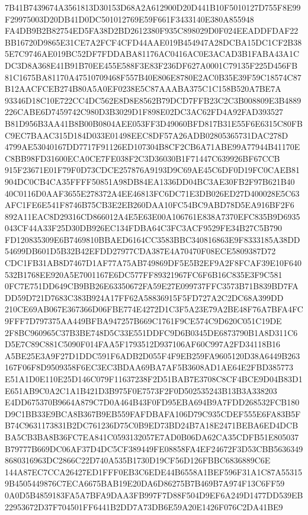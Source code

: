 \documentclass[UTF8,fontset=fandol,zihao=-4,a4paper]{ctexart}
\begin{document}
{{7B41B7439674A3561813D30153D68A2A612900D20D441B10F5010127D755F8E99F29975003D20DB41D0DC501012769E59F661F3433140E380A855948
FA4DB9B2B82754ED5FA38D2BD2612380F935C898029D0F024EEADDFDAF22BB16720D9865E31CE7A2FCF4CFD44AAE019B454947A28DCBA15DC1CF2B38
5E7C9746AE019BC52DF7FDDABA81176AC0416AC0E3ACAD3B1FABA43A1CDC3D8A368E41B91B70EE455E588F3E83F236DF627A0001C79135F225D456FB
81C1675BA81170A47510709468F557B40E806E8780E2AC0B35E39F59C18574C87B12AACFCEB274B80A5A0EF0238E5C87AAABA375C1C158B520A7BE7A
93346D18C10E722CC4DC562E8D8E8562B79DCD7FFB23C2C3B008809E3B4889226CABE6D7459742C980D3B3029D1F898E02DC3AC62FD4A92FAD393527
B81D956B3AA41B8B00B0804AEE053FF3D49060BFD817B31E55F6E6315C80FBC9EC7BAAC315D184D033E01498EEC8DF57A26ADB02805365731DAC278D
4799AE53040167DD7717F91126ED107304B8CF2CB6A71ABE99A77944B41170EC8BB98FD31600ECA0CE7FE038F2C3D36030B1F71447C639926BF67CCB
915F23671E01F79F0D73CDCE257876A9193D9C69AE45C6DF0D19FC0CAEB81904DC0CB4CA35FFFF50851A98DB84EA1336DD04BC3AE30FB2F97B621B40
40C0116D0AAF3655E278372A4EE46813FC6DC71E3DB026ED27D400028E5C63AFC1FE6E541F8746B75CB3E2EB260DAA10FC54BC9ABD78D5EA916BF2F6
892A11EAC8D29316CD866012A4E5E63E00A106761E838A7370EFC835B9D6935043CF44A33F25D30DB926EC134FDBA64C3FC3ACF9529FE34B27C5B790
FD120835309E6B7469810BBAED6164CC3583BBC340816863E9F8333185A38DD54699DB601D5B32B42EFDD27977CDA387E4A70470F08ECE5809387D72
CDC1FB31AB8D7467D1AF77A75AB749869DF5E5B2EF9A2F8FCAF39E10F640532B1768EE920A5E7001167E6DC577FF89321967FC6F6B16C835E3F9C581
0FC7E751DD649CB9BB26E63350672FA59E27E099737FFC3573B71B839BD7FADD59D721D7683C383B924A17FF62A58836915F5FD727A2C2DC68A399DD
210CE69AB067E367366D06FBE774E4272D1C3F5A23E79A2BE48F76A7BFA4FC9FFF7D797375AA449BFBA947257B669C1761F9CE574C9D620C051C19DE
2F8BC960965C37B3BE748D5C33E551DDFC9D6B0345DE6873790B1A8D311C6D5E7C89C881C5090F014FAA5F1793512D937106AF60C997A2FD34118B16
A5BE25E3A9F27D1DDC591F6ADB2D055F4F9EB259FA9605120D38A6449B263167F06F8D9509358F6EC3EC3BDAA69BA7AF5B3608AD1AE64E2FBD385773
E51A1D0E110E25D146C079F11637238F2D51BAB7E3708C8CF4BCE9D04B83D1E651AB9C0A2C1A1B421D3B975F0E7573F2F0D502535243B13B3A338203
E4DD675370B9664A879C7D0A464B43F0FD95EBA694B9A7FDD268532FCB180D9C1BB33E9BCA8B367B9EB559FAFDBAFA106D79C935CDEF555E6FA83B5F
B74C9631173831B2DC761236D75C0B9ED73BD24B7A18E2471BEBA6ED4DCBBA5CB3BA8B36FC7EA841C0593132057E7AD0B06DA62CA35CDFB51E805037
B79777B669DC06AF37D4DC5CF389449FE08858FA4EF24672F3D53CBB56363498680316963DC2866C22D740A535B1730D19CF56D126FBBC6836889C6E
144A87EC7CCA26427ED1FFF0EB3C6EDE44B6558A1BEF596F31A1C87A553159B4505449876C7ECA6675BAB19E20DA6D86275B7B469B7A974F13C6FF59
0A0D5B4859183FA5A7BFA9DAA3FB997F7D88F504D9EF6A249D1477DD539EB22953672D37F704501FF6441B2DD7A73DB6E59A20E1426F076C2DA41BE9
}}
\end{document}
